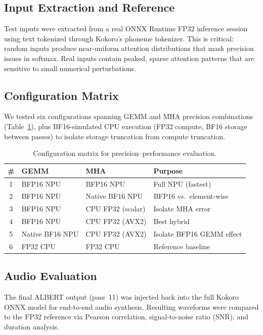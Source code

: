 \documentclass[11pt]{article}
\begin{document}
\subsection{Input Extraction and Reference}

Test inputs were extracted from a real ONNX Runtime FP32 inference session using text tokenized through Kokoro's phoneme tokenizer. This is critical: random inputs produce near-uniform attention distributions that mask precision issues in softmax. Real inputs contain peaked, sparse attention patterns that are sensitive to small numerical perturbations.

\subsection{Configuration Matrix}

We tested six configurations spanning GEMM and MHA precision combinations (Table~\ref{tab:configs}), plus BF16-simulated CPU execution (FP32 compute, BF16 storage between passes) to isolate storage truncation from compute truncation.

\begin{table}[t]
\centering
\caption{Configuration matrix for precision--performance evaluation.}
\label{tab:configs}
\small
\begin{tabular}{@{}clll@{}}
\toprule
\# & GEMM & MHA & Purpose \\
\midrule
1 & BFP16 NPU & BFP16 NPU & Full NPU (fastest) \\
2 & BFP16 NPU & Native BF16 NPU & BFP16 vs.\ element-wise \\
3 & BFP16 NPU & CPU FP32 (scalar) & Isolate MHA error \\
4 & BFP16 NPU & CPU FP32 (AVX2) & Best hybrid \\
5 & Native BF16 NPU & CPU FP32 (AVX2) & Isolate BFP16 GEMM effect \\
6 & FP32 CPU & FP32 CPU & Reference baseline \\
\bottomrule
\end{tabular}
\end{table}

\subsection{Audio Evaluation}

The final ALBERT output (pass~11) was injected back into the full Kokoro ONNX model for end-to-end audio synthesis. Resulting waveforms were compared to the FP32 reference via Pearson correlation, signal-to-noise ratio (SNR), and duration analysis.
\end{document}
